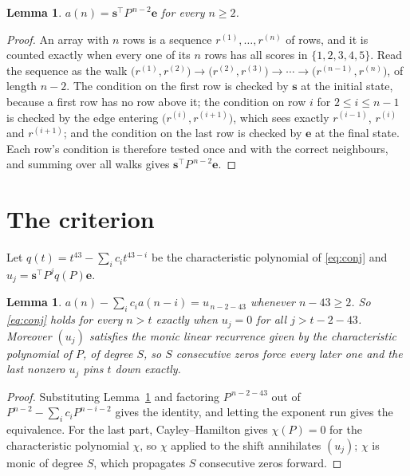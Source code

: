 \documentclass[11pt,a4paper]{article}
\theoremstyle{plain}
\newtheorem{lemma}[theorem]{Lemma}
\theoremstyle{definition}
\begin{document}
\begin{lemma}\label{lem:walk}
$a(n)=\mathbf{s}^{\!\top}P^{\,n-2}\mathbf{e}$ for every $n\ge2$.
\end{lemma}

\begin{proof}
An array with $n$ rows is a sequence $r^{(1)},\dots,r^{(n)}$ of rows, and it is counted
exactly when every one of its $n$ rows has all scores in $\{1,2,3,4,5\}$. Read the sequence as the
walk $\bigl(r^{(1)},r^{(2)}\bigr)\to\bigl(r^{(2)},r^{(3)}\bigr)\to\cdots\to
\bigl(r^{(n-1)},r^{(n)}\bigr)$, of length $n-2$. The condition on the first row is
checked by $\mathbf{s}$ at the initial state, because a first row has no row above it; the
condition on row $i$ for $2\le i\le n-1$ is checked by the edge entering
$\bigl(r^{(i)},r^{(i+1)}\bigr)$, which sees exactly $r^{(i-1)}$, $r^{(i)}$ and
$r^{(i+1)}$; and the condition on the last row is checked by $\mathbf{e}$ at the final
state. Each row's condition is therefore tested once and with the correct neighbours, and
summing over all walks gives $\mathbf{s}^{\!\top}P^{\,n-2}\mathbf{e}$.
\end{proof}

\section{The criterion}

Let $q(t)=t^{43}-\sum_i c_i t^{43-i}$ be the characteristic polynomial of
\eqref{eq:conj} and $u_j=\mathbf{s}^{\!\top}P^{j}q(P)\mathbf{e}$.

\begin{lemma}\label{lem:crit}
$a(n)-\sum_i c_i a(n-i)=u_{\,n-2-43}$ whenever $n-43\ge2$. So \eqref{eq:conj}
holds for every $n>t$ exactly when $u_j=0$ for all $j>t-2-43$. Moreover $(u_j)$
satisfies the monic linear recurrence given by the characteristic polynomial of $P$, of
degree $S$, so $S$ consecutive zeros force every later one and the last nonzero $u_j$ pins
$t$ down exactly.
\end{lemma}

\begin{proof}
Substituting Lemma~\ref{lem:walk} and factoring $P^{\,n-2-43}$ out of
$P^{n-2}-\sum_i c_i P^{n-i-2}$ gives the identity, and letting the exponent run gives the
equivalence. For the last part, Cayley--Hamilton gives $\chi(P)=0$ for the characteristic
polynomial $\chi$, so $\chi$ applied to the shift annihilates $(u_j)$; $\chi$ is monic of
degree $S$, which propagates $S$ consecutive zeros forward.
\end{proof}
\end{document}

